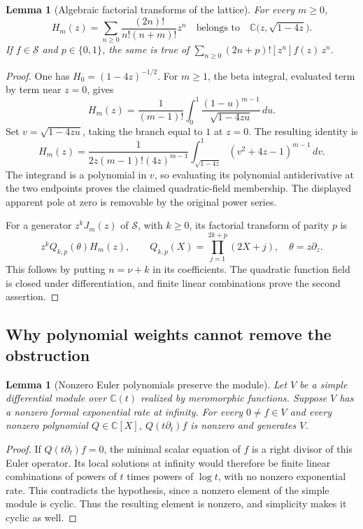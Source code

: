 \documentclass[11pt,a4paper]{article}
\newtheorem{lemma}[theorem]{Lemma}
\theoremstyle{definition}
\theoremstyle{remark}
\numberwithin{equation}{section}
\begin{document}
\begin{lemma}[Algebraic factorial transforms of the lattice]
\label{fusion:lattice-algebraic}
For every $m\ge0$,
\[
 H_m(z)=\sum_{n\ge0}\frac{(2n)!}{n!(n+m)!}z^n
 \quad\text{belongs to}\quad
 \mathbb C\bigl(z,\sqrt{1-4z}\bigr).
\]
If $f\in\mathcal S$ and $p\in\{0,1\}$, the same is true of
$\sum_{n\ge0}(2n+p)![z^n]f(z)\,z^n$.
\end{lemma}
\begin{proof}
One has $H_0=(1-4z)^{-1/2}$.  For $m\ge1$, the beta
integral, evaluated term by term near $z=0$, gives
\[
 H_m(z)=\frac1{(m-1)!}
 \int_0^1\frac{(1-u)^{m-1}}{\sqrt{1-4zu}}\,du.
\]
Set $v=\sqrt{1-4zu}$, taking the branch equal to $1$ at
$z=0$.  The resulting identity is
\[
 H_m(z)=\frac1{2z(m-1)!(4z)^{m-1}}
 \int_{\sqrt{1-4z}}^1(v^2+4z-1)^{m-1}\,dv.
\]
The integrand is a polynomial in $v$, so evaluating its
polynomial antiderivative at the two endpoints proves the
claimed quadratic-field membership.  The displayed apparent
pole at zero is removable by the original power series.

For a generator $z^kJ_m(z)$ of $\mathcal S$, with $k\ge0$,
its factorial transform of parity $p$ is
\[
 z^k Q_{k,p}(\theta)H_m(z),\qquad
 Q_{k,p}(X)=\prod_{j=1}^{2k+p}(2X+j),
 \quad\theta=z\partial_z.
\]
This follows by putting $n=\nu+k$ in its coefficients.
The quadratic function field is closed under differentiation,
and finite linear combinations prove the second assertion.
\end{proof}

\subsection{Why polynomial weights cannot remove the obstruction}

\begin{lemma}[Nonzero Euler polynomials preserve the module]
\label{fusion:euler-noncancellation}
Let $V$ be a simple differential module over $\mathbb C(t)$
realized by meromorphic functions.  Suppose $V$ has a nonzero
formal exponential rate at infinity.  For every $0\ne f\in V$
and every nonzero polynomial $Q\in\mathbb C[X]$,
$Q(t\partial_t)f$ is nonzero and generates $V$.
\end{lemma}
\begin{proof}
If $Q(t\partial_t)f=0$, the minimal scalar equation of $f$
is a right divisor of this Euler operator.  Its local solutions
at infinity would therefore be finite linear combinations
of powers of $t$ times powers of $\log t$, with no nonzero
exponential rate.  This contradicts the hypothesis, since a
nonzero element of the simple module is cyclic.  Thus the
resulting element is nonzero, and simplicity makes it cyclic
as well.
\end{proof}
\end{document}

